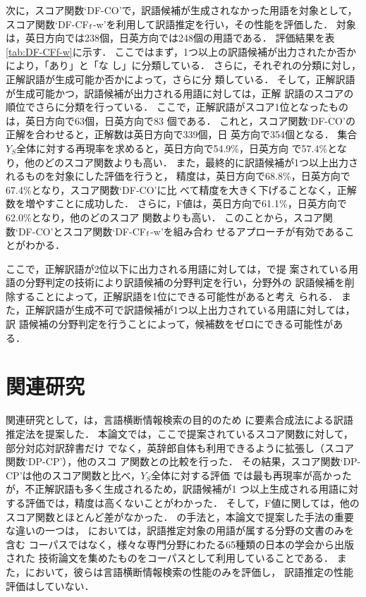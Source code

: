 \documentclass[japanese]{jnlp_1.3a}
\begin{document}
次に，スコア関数`DF-CO'で，訳語候補が生成されなかった用語を対象として，
スコア関数`DF-CF${\rm _f}$-w'を利用して訳語推定を行い，その性能を評価した．
対象は，英日方向では238個，日英方向では248個の用語である．
評価結果を表\ref{tab:DF-CFf-w}に示す．
ここではまず，1つ以上の訳語候補が出力されたか否かにより，「あり」と「な
し」に分類している．
さらに，それぞれの分類に対し，正解訳語が生成可能か否かによって，さらに分
類している．
そして，正解訳語が生成可能かつ，訳語候補が出力される用語に対しては，正解
訳語のスコアの順位でさらに分類を行っている．
ここで，正解訳語がスコア1位となったものは，英日方向で63個，日英方向で83
個である．
これと，スコア関数`DF-CO'の正解を合わせると，正解数は英日方向で339個，日
英方向で354個となる．
集合$Y_S$全体に対する再現率を求めると，英日方向で54.9\%，日英方向
で57.4\%となり，他のどのスコア関数よりも高い．
また，最終的に訳語候補が1つ以上出力されるものを対象にした評価を行うと，
精度は，英日方向で68.8\%，日英方向で67.4\%となり，スコア関数`DF-CO'に比
べて精度を大きく下げることなく，正解数を増やすことに成功した．
さらに，F値は，英日方向で61.1\%，日英方向で62.0\%となり，他のどのスコア
関数よりも高い．
このことから，スコア関数`DF-CO'とスコア関数`DF-CF${\rm _f}$-w'を組み合わ
せるアプローチが有効であることがわかる．


ここで，正解訳語が2位以下に出力される用語に対しては，\cite{Kida06}で提
案されている用語の分野判定の技術により訳語候補の分野判定を行い，分野外の
訳語候補を削除することによって，正解訳語を1位にできる可能性があると考え
られる．
また，正解訳語が生成不可で訳語候補が1つ以上出力されている用語に対しては，訳
語候補の分野判定を行うことによって，候補数をゼロにできる可能性がある．

\section{関連研究}
\label{sec:related_work}

関連研究として，\cite{Fujii00}は，言語横断情報検索の目的のため
に要素合成法による訳語推定法を提案した．
本論文では，ここで提案されているスコア関数に対して，部分対応対訳辞書だけ
でなく，英辞郎自体も利用できるように拡張し（スコア関数`DP-CP'），他のスコ
ア関数との比較を行った．
その結果，スコア関数`DP-CP'は他のスコア関数と比べ，$Y_S$全体に対する評価
では最も再現率が高かったが，不正解訳語も多く生成されるため，訳語候補が1
つ以上生成される用語に対する評価では，精度は高くないことがわかった．
そして，F値に関しては，他のスコア関数とほとんど差がなかった．
\cite{Fujii00}の手法と，本論文で提案した手法の重要な違いの一つは，
\cite{Fujii00}においては，訳語推定対象の用語が属する分野の文書のみを含む
コーパスではなく，様々な専門分野にわたる65種類の日本の学会から出版された
技術論文を集めたものをコーパスとして利用していることである．
また，\cite{Fujii00}において，彼らは言語横断情報検索の性能のみを評価し，
訳語推定の性能評価はしていない．
\end{document}
